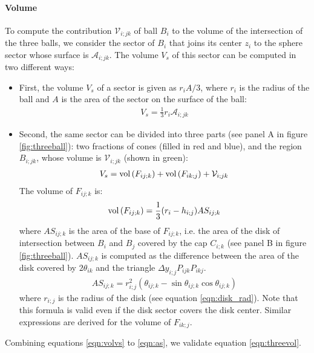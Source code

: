 \documentclass[11 pt]{article}
\newcommand {\mm}[1] {\ifmmode{#1}\else{\mbox{\(#1\)}}\fi}
\theoremstyle{plain} \theorembodyfont{\rmfamily}
\newcommand{\Volume}[1]     {\mm{\rm vol\,}{#1}}
\begin{document}
\paragraph{Volume}

To compute the contribution $\mathcal{V}_{i;jk}$ of ball $B_i$ to the volume of the intersection of the three balls, we consider the sector of $B_i$ that joins its center $z_i$ to the sphere sector whose surface is $\mathcal{A}_{i;jk}$.  The volume $V_s$ of this sector can  be computed in two different ways:

\begin{itemize}

\item First, the volume $V_s$ of a sector is given as $r_i A/3$, where $r_i$ is the radius of the ball and $A$ is the area of the sector on the surface of the ball:
\begin{eqnarray}
V_s = \frac{1}{3} r_i \mathcal{A}_{i;jk}
\label{eqn:volvs}
\end{eqnarray}
\item Second, the same sector can be divided into three parts (see panel A in figure \ref{fig:threeball}): two fractions of cones (filled in red and blue), and the region $B_{i;jk}$, whose volume is $\mathcal{V}_{i;jk}$ (shown in green):
\begin{eqnarray}
V_s = \Volume{(F_{ij;k})} + \Volume{(F_{ik;j})} + \mathcal{V}_{i;jk}
\end{eqnarray}
The volume of $F_{ij;k}$ is:
\begin{eqnarray}
\Volume{(F_{ij;k})} = \frac{1}{3} (r_i -h_{i;j}) AS_{ij;k}
\end{eqnarray}
where $AS_{ij;k}$ is the area of the base of $F_{ij;k}$, i.e. the area of the disk of intersection between $B_i$ and $B_j$ covered by the cap
$C_{i;k}$ (see panel B in figure \ref{fig:threeball}). $AS_{ij;k}$ is computed as the difference between the area of the disk covered by $2\theta_{ik}$ and the triangle $\Delta y_{i;j} P_{ijk} P_{ikj}$.
\begin{eqnarray}
AS_{ij;k} = r_{i;j}^2 \left (\theta_{ij;k} - \sin {\theta_{ij;k} }  \cos {\theta_{ij;k} } \right)
\label{eqn:as}
\end{eqnarray}
where $r_{i;j}$ is the radius of the disk (see equation \ref{eqn:disk_rad}). Note that this formula is valid even if the disk sector covers the disk center.
Similar expressions are derived for the volume of $F_{ik;j}$.
\end{itemize}

Combining equations \ref{eqn:volvs} to \ref{eqn:as}, we validate equation \ref{eqn:threevol}.
\end{document}
